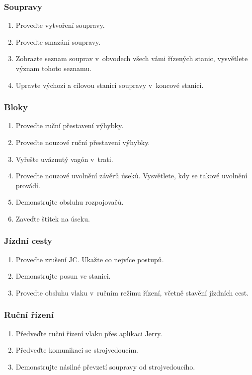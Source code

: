 \documentclass[12pt,a4paper]{article}
\begin{document}
\subsubsection*{Soupravy}
\begin{enumerate}[leftmargin=*]
\item Proveďte vytvoření soupravy.
\item Proveďte smazání soupravy.
\item Zobrazte seznam souprav v~obvodech všech vámi řízených stanic, vysvětlete
význam tohoto seznamu.
\item Upravte výchozí a cílovou stanici soupravy v~koncové stanici.
\end{enumerate}

\subsubsection*{Bloky}
\begin{enumerate}[leftmargin=*]
\item Proveďte ruční přestavení výhybky.
\item Proveďte nouzové ruční přestavení výhybky.
\item Vyřešte uváznutý vagón v~trati.
\item Proveďte nouzové uvolnění závěrů úseků. Vysvětlete, kdy se takové uvolnění
provádí.
\item Demonstrujte obsluhu rozpojovačů.
\item Zaveďte štítek na úseku.
\end{enumerate}

\subsubsection*{Jízdní cesty}
\begin{enumerate}[leftmargin=*]
\item Proveďte zrušení JC. Ukažte co nejvíce postupů.
\item Demonstrujte posun ve stanici.
\item Proveďte obsluhu vlaku v~ručním režimu řízení, včetně stavění jízdních
cest.
\end{enumerate}

\subsubsection*{Ruční řízení}
\begin{enumerate}[leftmargin=*]
\item Předveďte ruční řízení vlaku přes aplikaci Jerry.
\item Předveďte komunikaci se strojvedoucím.
\item Demonstrujte násilné převzetí soupravy od strojvedoucího.
\end{enumerate}
\end{document}
